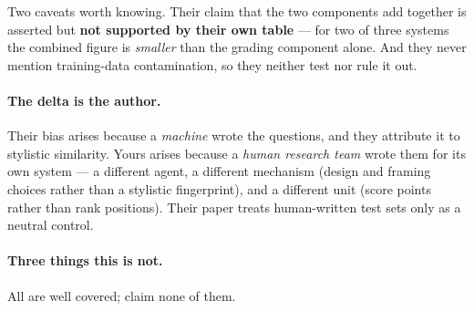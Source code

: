 \documentclass[11pt,a4paper]{article}
\begin{document}
\begin{center}
\end{center}

Two caveats worth knowing. Their claim that the two components add together is
asserted but \textbf{not supported by their own table} --- for two of three systems
the combined figure is \emph{smaller} than the grading component alone. And they
never mention training-data contamination, so they neither test nor rule it out.

\paragraph{The delta is the author.} Their bias arises because a \emph{machine}
wrote the questions, and they attribute it to stylistic similarity. Yours arises
because a \emph{human research team} wrote them for its own system --- a different
agent, a different mechanism (design and framing choices rather than a stylistic
fingerprint), and a different unit (score points rather than rank positions). Their
paper treats human-written test sets only as a neutral control.

\paragraph{Three things this is not.} All are well covered; claim none of them.
\end{document}
